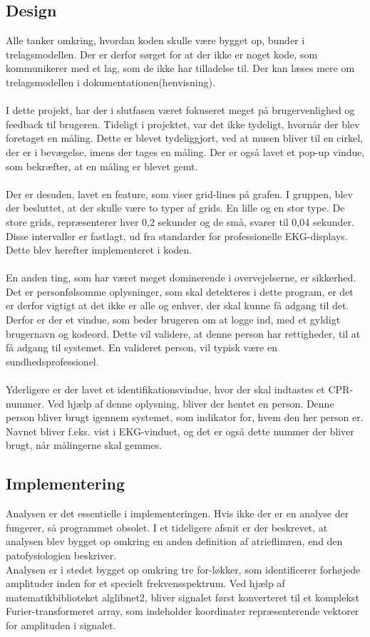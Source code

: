 \subsection{Design}
Alle tanker omkring, hvordan koden skulle være bygget op, bunder i trelagsmodellen. Der er derfor sørget for at der ikke er noget kode, som kommunikerer med et lag, som de ikke har tilladelse til. Der kan læses mere om trelagsmodellen i dokumentationen(henvisning).\\ \\
I dette projekt, har der i slutfasen været fokuseret meget på brugervenlighed og feedback til brugeren. Tideligt i projektet, var det ikke tydeligt, hvornår der blev foretaget en måling. Dette er blevet tydeliggjort, ved at musen bliver til en cirkel, der er i bevægelse, imens der tages en måling. Der er også lavet et pop-up vindue, som bekræfter, at en måling er blevet gemt.\\ \\
Der er desuden, lavet en feature, som viser grid-lines på grafen. I gruppen, blev der besluttet, at der skulle være to typer af grids. En lille og en stor type.  De store grids, repræsenterer hver 0,2 sekunder og de små, svarer til 0,04 sekunder. Disse intervaller er fastlagt, ud fra standarder for professionelle EKG-displays.  Dette blev herefter implementeret i koden.\\ \\
En anden ting, som har været meget dominerende i overvejelserne, er sikkerhed. Det er personfølsomme oplysninger, som skal detekteres i dette program, er det er derfor vigtigt at det ikke er alle og enhver, der skal kunne få adgang til det. Derfor er der et vindue, som beder brugeren om at logge ind, med et gyldigt brugernavn og kodeord. Dette vil validere, at denne person har rettigheder, til at få adgang til systemet. En valideret person, vil typisk være en sundhedsprofessionel.\\ \\
Yderligere er der lavet et identifikationsvindue, hvor der skal indtastes et CPR-nummer. Ved hjælp af denne oplysning, bliver der hentet en person. Denne person bliver brugt igennem systemet, som indikator for, hvem den her person er. Navnet bliver f.eks. vist i EKG-vinduet, og det er også dette nummer der bliver brugt, når målingerne skal gemmes.  

\subsection{Implementering}
Analysen er det essentielle i implementeringen. Hvis ikke der er en analyse der fungerer, så programmet obsolet. I et tideligere afsnit er der beskrevet, at analysen blev bygget op omkring en anden definition af atrieflimren, end den patofysiologien beskriver.
\\
Analysen er i stedet bygget op omkring tre for-løkker, som identificerer forhøjede amplituder inden for et specielt frekvensspektrum. Ved hjælp af matematikbiblioteket alglibnet2, bliver signalet først konverteret til et komplekst Furier-transformeret array, som indeholder koordinater repræsenterende vektorer for amplituden i signalet. 

